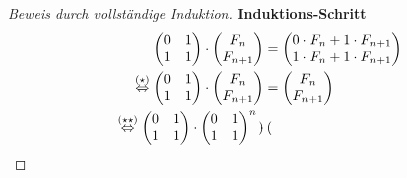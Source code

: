 \documentclass[a4paper]{scrartcl}
\begin{document}
\begin{enumerate}[(a)]
\begin{proof}[Beweis durch vollständige Induktion]
            \textbf{Induktions-Schritt} \\
            \begin{equation}
                \begin{split}
                    \begin{pmatrix}
                        0 & 1 \\
                        1 & 1
                    \end{pmatrix}
                    \cdot
                    \begin{pmatrix}
                        F_n \\ F_{n+1}
                    \end{pmatrix}
                    &=
                    \begin{pmatrix}
                        0 \cdot F_n + 1 \cdot F_{n+1} \\
                        1 \cdot F_n + 1 \cdot F_{n+1} \\
                    \end{pmatrix} \\
                    \stackrel{(\star)}{\Leftrightarrow}
                    \begin{pmatrix}
                        0 & 1 \\
                        1 & 1
                    \end{pmatrix}
                    \cdot
                    \begin{pmatrix}
                        F_n \\ F_{n+1}
                    \end{pmatrix}
                    &=
                    \begin{pmatrix}
                        F_n \\ F_{n+1}
                    \end{pmatrix} \\
                    \stackrel{(\star\star)}{\Leftrightarrow}
                    \begin{pmatrix}
                        0 & 1 \\
                        1 & 1
                    \end{pmatrix}
                    \cdot
                    \begin{pmatrix}
                        0 & 1 \\
                        1 & 1
                    \end{pmatrix}^n
                    \cdot
                    \begin{pmatrix}

\end{pmatrix}
\end{split}
\end{equation}
\end{proof}
\end{enumerate}
\end{document}
